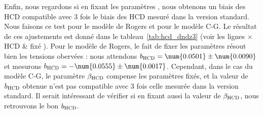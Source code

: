 Enfin, nous regardons si en fixant les paramètres \lya{}, nous obtenons un biais des HCD compatible avec 3 fois le biais des HCD mesuré dans la version standard. Nous faisons ce test pour le modèle de Rogers et pour le modèle C-G. Le résultat de ces ajustements est donné dans le tableau~\ref{tab:hcd_dndz3} (voir les lignes $\times$HCD \& \lya{} fixé \fg).
Pour le modèle de Rogers, le fait de fixer les paramètres \lya{} résout bien les tensions obervées : nous attendons $b_{\textsc{HCD}} = \num{0.0501} \pm \num{0.0090}$ et mesurons $b_{\textsc{HCD}} = -\num{0.0555} \pm \num{0.0017}$.
  Cependant, dans le cas du modèle C-G, le paramètre $\beta_{\textsc{HCD}}$ compense les paramètres \lya{} fixés, et la valeur de $b_{\textsc{HCD}}$ obtenue n'est pas compatible avec 3 fois celle mesurée dans la version standard.
  Il serait intéressant de vérifier si en fixant aussi la valeur de $\beta_{\textsc{HCD}}$, nous retrouvons le bon $b_{\textsc{HCD}}$.


